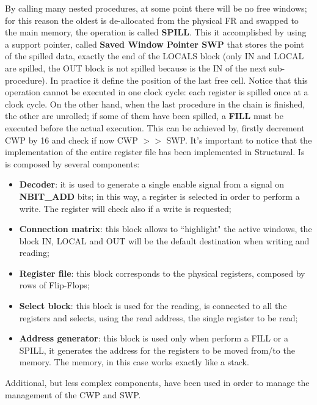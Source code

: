 By calling many nested procedures, at some point there will be no free windows; for this reason the oldest is de-allocated from the physical FR and swapped to the main memory, the operation is called \textbf{SPILL}. This it accomplished by using a support pointer, called \textbf{Saved Window Pointer SWP} that stores the point of the spilled data, exactly the end of the LOCALS block (only IN and LOCAL are spilled, the OUT block is not spilled because is the IN of the next sub-procedure). In practice it define the position of the last free cell. Notice that this operation cannot be executed in one clock cycle: each register is spilled once at a clock cycle.\newline\newline
On the other hand, when the last procedure in the chain is finished, the other are unrolled; if some of them have been spilled, a \textbf{FILL} must be executed before the actual execution. This can be achieved by, firstly decrement CWP by 16 and check if now CWP $>>$ SWP.\newline\newline
It's important to notice that the implementation of the entire register file has been implemented in Structural. Is is composed by several components:
\begin{itemize}
	\item \textbf{Decoder}: it is used to generate a single enable signal from a signal on \textbf{NBIT\_ADD} bits; in this way, a register is selected in order to perform a write. The register will check also if a write is requested;
	\item \textbf{Connection matrix}: this block allows to ``highlight" the active windows, the block IN, LOCAL and OUT will be the default destination when writing and reading;
	\item \textbf{Register file}: this block corresponds to the physical registers, composed by rows of Flip-Flops;
	\item \textbf{Select block}: this block is used for the reading, is connected to all the registers and selects, using the read address, the single register to be read;
	\item \textbf{Address generator}: this block is used only when perform a FILL or a SPILL, it generates the address for the registers to be moved from/to the memory. The memory, in this case works exactly like a stack.
\end{itemize}
Additional, but less complex components, have been used in order to manage the management of the CWP and SWP.


